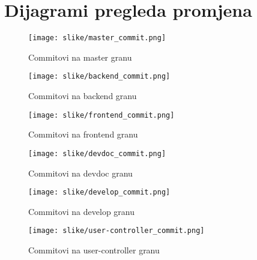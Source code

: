 					
		\eject
		\section*{Dijagrami pregleda promjena}
		
		
		
		\begin{figure}[H]
			\texttt{[image: slike/master\_commit.png]} %
			\centering
			\caption{Commitovi na master granu}
			\label{fig:mastercommit}
		\end{figure}
	
		\begin{figure}[H]
			\texttt{[image: slike/backend\_commit.png]} %
			\centering
			\caption{Commitovi na backend granu}
			\label{fig:backendrcommit}
		\end{figure}
	
		\begin{figure}[H]
			\texttt{[image: slike/frontend\_commit.png]} %
			\centering
			\caption{Commitovi na frontend granu}
			\label{fig:frontedncommit}
		\end{figure}
	
		\begin{figure}[H]
			\texttt{[image: slike/devdoc\_commit.png]} %
			\centering
			\caption{Commitovi na devdoc granu}
			\label{fig:devdoccommit}
		\end{figure}
	
		\begin{figure}[H]
			\texttt{[image: slike/develop\_commit.png]} %
			\centering
			\caption{Commitovi na develop granu}
			\label{fig:developcommit}
		\end{figure}
	
		\begin{figure}[H]
			\texttt{[image: slike/user-controller\_commit.png]} %
			\centering
			\caption{Commitovi na user-controller granu}
			\label{fig:controllercommit}
		\end{figure}
		
